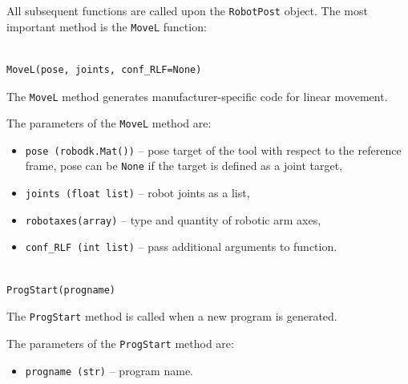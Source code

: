 All subsequent functions are called upon the \texttt{RobotPost} object. The most important method is the \texttt{MoveL} function:


\begin{verbatim}

MoveL(pose, joints, conf_RLF=None)

\end{verbatim}

The \texttt{MoveL} method generates manufacturer-specific code for linear movement. 


The parameters of the \texttt{MoveL} method are:

\begin{itemize}

\item \texttt{pose (robodk.Mat())} -- pose target of the tool with respect to the reference frame, pose can be \texttt{None} if the target is defined as a joint target,

\item \texttt{joints (float list)} -- robot joints as a list,

\item \texttt{robotaxes(array)} -- type and quantity of robotic arm axes,

\item \texttt{conf_RLF (int list)} -- pass additional arguments to function. 

\end{itemize}



\begin{verbatim}

ProgStart(progname)

\end{verbatim}

The \texttt{ProgStart} method is called when a new program is generated.


The parameters of the \texttt{ProgStart} method are:

\begin{itemize}

\item \texttt{progname (str)} -- program name.

\end{itemize}

